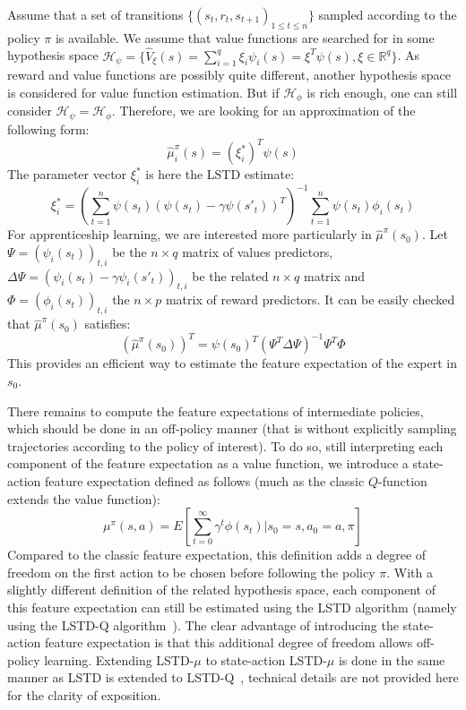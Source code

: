 \documentclass{llncs}
\begin{document}
Assume that a set of transitions $\{(s_t,r_t,s_{t+1})_{1\leq t \leq
n}\}$ sampled according to the policy $\pi$ is available. We assume
that value functions are searched for in some  hypothesis space
$\mathcal{H}_\psi = \{ \hat{V}_\xi(s) = \sum\limits_{i=1}^q \xi_i \psi_i(s)
= \xi^T \psi(s), \xi\in\mathbb{R}^q\}$. As reward and value
functions are possibly quite different, another hypothesis space is
considered for value function estimation. But if $\mathcal{H}_\phi$
is rich enough, one can still consider
$\mathcal{H}_\psi=\mathcal{H}_\phi$. Therefore, we are looking for
an approximation of the following form:
\begin{equation}
  \hat{\mu}_i^\pi(s) = (\xi_i^*)^T \psi(s)
  \label{eqn:psi}
\end{equation}
The parameter vector $\xi_i^*$ is here the LSTD estimate:
\begin{equation}
  \xi_i^* = \left(\sum_{t=1}^n
  \psi(s_t)(\psi(s_t)-\gamma\psi(s'_{t}))^T\right)^{-1}
  \sum_{t=1}^n \psi(s_t) \phi_i(s_t)
\end{equation}
For apprenticeship learning, we are interested more particularly in
$\hat{\mu}^\pi(s_0)$. Let $\Psi = (\psi_i(s_t))_{t,i}$ be the
$n\times q$ matrix of values predictors, $\Delta\Psi = (\psi_i(s_t)
- \gamma\psi_i(s'_t))_{t,i}$ be the related $n\times q$ matrix and
$\Phi = (\phi_i(s_t))_{t,i}$ the $n\times p$ matrix of reward
predictors. It can be easily checked that $\hat{\mu}^\pi(s_0)$
satisfies:
\begin{equation}
  (\hat{\mu}^\pi(s_0))^T = \psi(s_0)^T (\Psi^T \Delta\Psi)^{-1} \Psi^T \Phi
\end{equation}
This provides an efficient way to estimate the feature expectation
of the expert in $s_0$.

There remains to compute the feature expectations of intermediate
policies, which should be done in an off-policy manner (that is
without explicitly sampling trajectories according to the policy of
interest). To do so, still interpreting each component of the
feature expectation as a value function, we introduce a state-action
feature expectation defined as follows (much as the classic
$Q$-function extends the value function):
\begin{equation}
  \mu^\pi(s,a) = E[\sum_{t=0}^\infty \gamma^t
  \phi(s_t)|s_0=s,a_0=a,\pi]
\end{equation}
Compared to the classic feature expectation, this definition adds a
degree of freedom on the first action to be chosen before following
the policy $\pi$. With a slightly different definition of the
related hypothesis space, each component of this feature expectation
can still be estimated using the LSTD algorithm (namely using the
LSTD-Q algorithm~\citep{lagoudakis2003least}). The clear advantage of
introducing the state-action feature expectation is that this
additional degree of freedom allows off-policy learning.
Extending LSTD-$\mu$ to state-action LSTD-$\mu$ is done in the same
manner as LSTD is extended to LSTD-Q~\citep{lagoudakis2003least},
technical details are not provided here for the clarity of
exposition.
\end{document}
